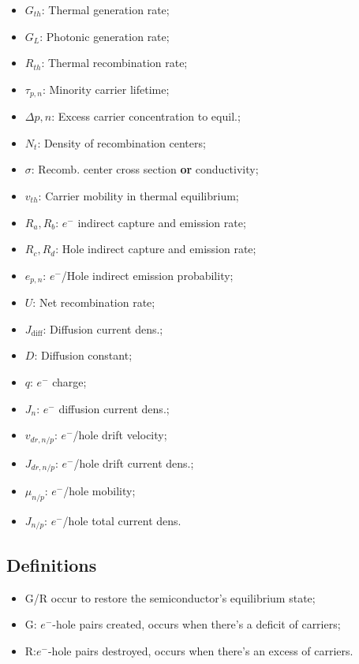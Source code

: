 \documentclass[a4paper, fontsize=8pt, landscape, DIV=1]{scrartcl}
\begin{document}
\begin{multicols*}{4}
    \begin{itemize}[nolistsep, noitemsep]
    \item  $G_{th}$: Thermal generation rate;
    \item  $G_{L}$: Photonic generation rate;
    \item  $R_{th}$: Thermal recombination rate;
    \item  $\tau_{p,n}$: Minority carrier lifetime;
    \item  $\Delta {p,n}$: Excess carrier concentration to equil.;
    \item  $N_t$: Density of recombination centers;
    \item  $\sigma$: Recomb. center cross section \textbf{or} conductivity;
    \item  $v_{th}$: Carrier mobility in thermal equilibrium;
    \item  $R_a,R_b$: $e^-$ indirect capture and emission rate;
    \item  $R_c,R_d$: Hole indirect capture and emission rate;
    \item  $e_{p,n}$: $e^-$/Hole indirect emission probability;
    \item  $U$: Net recombination rate;
    \item  $J_{\text{diff}}$: Diffusion current dens.;
    \item  $D$: Diffusion constant;
    \item  $q$: $e^-$ charge;
    \item  $J_n$: $e^-$ diffusion current dens.;
    \item  $v_{dr,n/p}$: $e^-$/hole drift velocity;
    \item  $J_{dr,n/p}$: $e^-$/hole drift current dens.;
    \item  $\mu_{n/p}$: $e^-$/hole mobility;
    \item  $J_{n/p}$: $e^-$/hole total current dens.
    \end{itemize}

\subsection{Definitions}
\begin{itemize}[nolistsep, noitemsep]
	\item G/R occur to restore the semiconductor's equilibrium state;
	\item G: $e^-$-hole pairs created, occurs when there's a deficit of carriers;
	\item R:$e^-$-hole pairs destroyed, occurs when there's an excess of carriers.
\end{itemize}


\end{multicols*}
\end{document}
